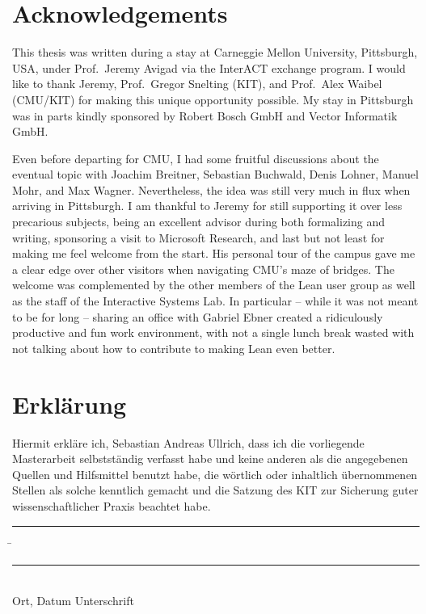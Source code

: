 \documentclass[12pt,a4paper,twoside]{article}
\begin{document}
\cleardoublepage
\pagestyle{fancy}
\fancyhf{}
\fancyhead[LE,RO]{\thepage}
\fancyhead[RE,LO]{\textit\leftmark}


\newpage

\newpage

\newpage

\newpage

\newpage

\newpage

\newpage

\newpage

\newpage

\newpage
\pagestyle{empty}
\section*{Acknowledgements}

This thesis was written during a stay at Carneggie Mellon University,
Pittsburgh, USA, under Prof.\ Jeremy Avigad via the InterACT exchange program. I
would like to thank Jeremy, Prof.\ Gregor Snelting (KIT), and Prof.\ Alex Waibel
(CMU/KIT) for making this unique opportunity possible. My stay in Pittsburgh was
in parts kindly sponsored by Robert Bosch GmbH and Vector Informatik GmbH.

Even before departing for CMU, I had some fruitful discussions about the
eventual topic with Joachim Breitner, Sebastian Buchwald, Denis Lohner, Manuel
Mohr, and Max Wagner. Nevertheless, the idea was still very much in flux when
arriving in Pittsburgh. I am thankful to Jeremy for still supporting it over less
precarious subjects, being an excellent advisor during both formalizing and
writing, sponsoring a visit to Microsoft Research, and last but not least for
making me feel welcome from the start. His personal tour of the campus gave me a
clear edge over other visitors when navigating CMU's maze of bridges. The
welcome was complemented by the other members of the Lean user group as well as
the staff of the Interactive Systems Lab. In particular -- while it was not meant
to be for long -- sharing an office with Gabriel Ebner created a ridiculously
productive and fun work environment, with not a single lunch break wasted with
not talking about how to contribute to making Lean even better.

\newpage
{}



\cleardoublepage
\pagestyle{empty}
\section*{Erklärung}

  \vspace{20mm}
  Hiermit erkläre ich, Sebastian Andreas Ullrich, dass ich die vorliegende Masterarbeit selbst\-ständig
verfasst habe und keine anderen als die angegebenen Quellen und Hilfsmittel
benutzt habe, die wörtlich oder inhaltlich übernommenen Stellen als solche kenntlich gemacht und
die Satzung des KIT zur Sicherung guter wissenschaftlicher Praxis beachtet habe.
  \vspace{20mm}
  \begin{tabbing}
  \rule{4cm}{.4pt}\hspace{1cm} \= \rule{7cm}{.4pt} \\
 Ort, Datum \> Unterschrift
  \end{tabbing}
\end{document}
